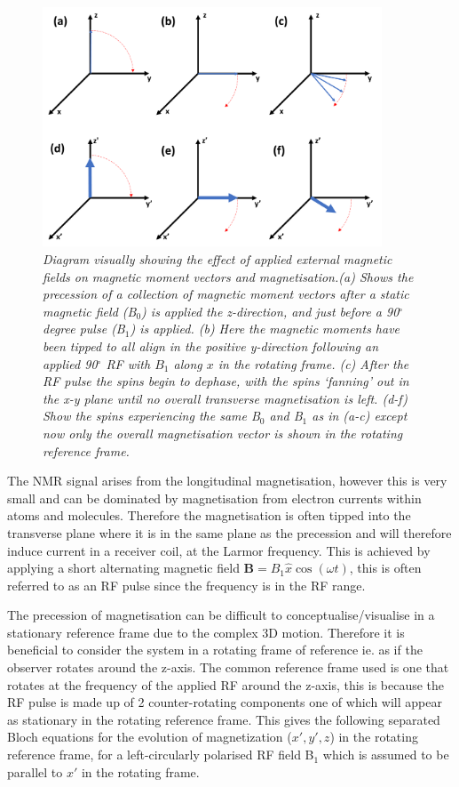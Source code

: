 \begin{figure}
    \centering
    \includegraphics[width=0.9\textwidth]{Figures/Theory/Magnetisation.png}
    \caption{\textit{Diagram visually showing the effect of applied external magnetic fields on magnetic moment vectors and magnetisation.(a) Shows the precession of a collection of magnetic moment vectors after a static magnetic field (B$_0$) is applied the z-direction, and just before a 90$^\circ$ degree pulse (B$_1$) is applied. (b) Here the magnetic moments have been tipped to all align in the positive y-direction following an applied 90$^\circ$ \ac{RF} with $B_1$ along $x$ in the rotating frame. (c) After the \ac{RF} pulse the spins begin to dephase, with the spins `fanning' out in the x-y plane until no overall transverse magnetisation is left. (d-f) Show the spins experiencing the same B$_0$ and B$_1$ as in (a-c) except now only the overall magnetisation vector is shown in the rotating reference frame.}}
    \label{fig:theory:Mag}
\end{figure}


The \ac{NMR} signal arises from the longitudinal magnetisation, however this is very small and can be dominated by magnetisation from electron currents within atoms and molecules. Therefore the magnetisation is often tipped into the transverse plane where it is in the same plane as the precession and will therefore induce current in a receiver coil, at the Larmor frequency. This is achieved by applying a short alternating magnetic field $\mathbf{B} = B_1\hat{x}\cos (\omega t)$, this is often referred to as an \ac{RF} pulse since the frequency is in the \ac{RF} range.

The precession of magnetisation can be difficult to conceptualise/visualise in a stationary reference frame due to the complex 3D motion. Therefore it is beneficial to consider the system in a rotating frame of reference ie. as if the observer rotates around the z-axis. The common reference frame used is one that rotates at the frequency of the applied \ac{RF} around the z-axis, this is because the \ac{RF} pulse is made up of 2 counter-rotating components one of which will appear as stationary in the rotating reference frame. This gives the following separated Bloch equations for the evolution of magnetization ($x',y',z$) in the rotating reference frame, for a left-circularly polarised \ac{RF} field B$_1$ which is assumed to be parallel to $x'$ in the rotating frame.

